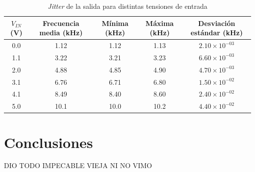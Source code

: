 \documentclass[../../tc_tp6_main.tex]{subfiles}
\begin{document}
\begin{table}[H]
	\centering
	\begin{tabular}{|c||c|c|c|c|}
	\hline
	$V_{IN}$ (V) 	& Frecuencia media (kHz) 	& M\'inima (kHz) 	& M\'axima (kHz) 	& Desviaci\'on est\'andar (kHz) 	\\ \hline \hline
	0.0          		& 1.12                   		& 1.12                      	& 1.13                      	& $2.10\times 10^{-03}$           	\\ \hline
	1.1          		& 3.22                   		& 3.21                      	& 3.23                      	& $6.60\times 10^{-03}$           	\\ \hline
	2.0          		& 4.88                   		& 4.85                      	& 4.90                      	& $4.70\times 10^{-03}$           	\\ \hline
	3.1          		& 6.76                   		& 6.71                     	& 6.80                      	& $1.50\times 10^{-02}$           	\\ \hline
	4.1          		& 8.49                   		& 8.40                      	& 8.60                      	& $2.40\times 10^{-02}$          	\\ \hline
	5.0          		& 10.1                   		& 10.0                      	& 10.2                      	& $4.40\times 10^{-02}$           	\\ \hline
	\end{tabular}
	\caption{\textit{Jitter} de la salida para distintas tensiones de entrada}
\end{table}



\section{Conclusiones}

DIO TODO IMPECABLE VIEJA NI NO VIMO
\end{document}
